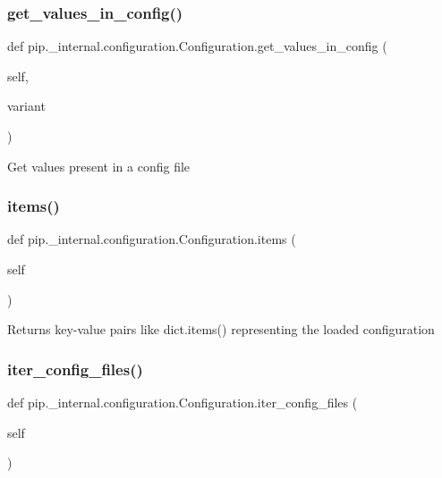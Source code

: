 \subsubsection{\texorpdfstring{get\+\_\+values\+\_\+in\+\_\+config()}{get\_values\_in\_config()}}
{\footnotesize\ttfamily def pip.\+\_\+internal.\+configuration.\+Configuration.\+get\+\_\+values\+\_\+in\+\_\+config (\begin{DoxyParamCaption}\item[{}]{self,  }\item[{}]{variant }\end{DoxyParamCaption})}

\begin{DoxyVerb}Get values present in a config file\end{DoxyVerb}
 \mbox{\label{classpip_1_1__internal_1_1configuration_1_1Configuration_a43a724f440f49a72db825d19c0faa921}} 
\subsubsection{\texorpdfstring{items()}{items()}}
{\footnotesize\ttfamily def pip.\+\_\+internal.\+configuration.\+Configuration.\+items (\begin{DoxyParamCaption}\item[{}]{self }\end{DoxyParamCaption})}

\begin{DoxyVerb}Returns key-value pairs like dict.items() representing the loaded
configuration
\end{DoxyVerb}
 \mbox{\label{classpip_1_1__internal_1_1configuration_1_1Configuration_a61a09119ec40e2cf719aad5a2aa77758}} 
\subsubsection{\texorpdfstring{iter\+\_\+config\+\_\+files()}{iter\_config\_files()}}
{\footnotesize\ttfamily def pip.\+\_\+internal.\+configuration.\+Configuration.\+iter\+\_\+config\+\_\+files (\begin{DoxyParamCaption}\item[{}]{self }\end{DoxyParamCaption})}

